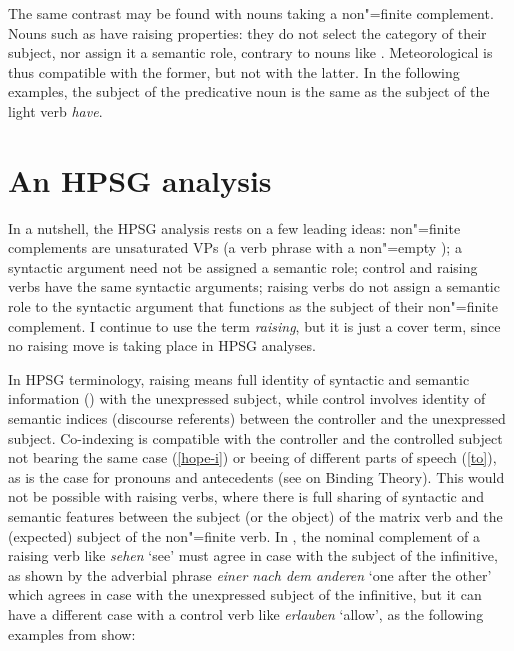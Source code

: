 The same contrast may be found with  nouns taking a non"=finite complement. Nouns such as  have raising properties: they do not select the category of their subject, nor assign it a semantic role, contrary to nouns like . Meteorological  is thus compatible with the former, but not with the latter. In the following examples, the subject of the predicative noun is the same as the subject of the light verb \emph{have}.


\eal
{}
\zl

\section{An HPSG analysis}


In a nutshell, the HPSG analysis rests on a few leading ideas: non"=finite complements are
unsaturated VPs (a verb phrase with a non"=empty \subjl); a syntactic argument need not be assigned
a semantic role; control and raising verbs have the same syntactic arguments; raising verbs do not
assign a semantic role to the syntactic argument that functions as the subject of their non"=finite
complement. 
I continue to use the term \emph{raising}, but it is just a cover term, since no raising move
is taking place in HPSG analyses.

In HPSG terminology, raising means full identity of syntactic and semantic
information () \crossrefchapterp[\pageref{ex:prop22}--\pageref{ex:prop24}]{properties} with the unexpressed subject, while
control involves identity of semantic indices (discourse referents) between the controller and the
unexpressed subject. Co-indexing is compatible with the controller and the controlled subject not
bearing the same case (\ref{hope-i}) or beeing of different parts of speech (\ref{to}), as is the
case for pronouns and antecedents (see  on Binding Theory). This would not be possible
with raising verbs, where there is full sharing of syntactic and semantic features between the
subject (or the object) of the matrix verb and the (expected) subject of the non"=finite verb. In
, the nominal complement of a raising verb like \emph{sehen} `see' must agree in case
with the subject of the infinitive, as shown by the adverbial phrase \emph{einer nach dem anderen} `one after the other' which
agrees in case with the unexpressed subject of the infinitive, but it can have a different case with
a control verb like \emph{erlauben} `allow', as the following examples from  show: 


